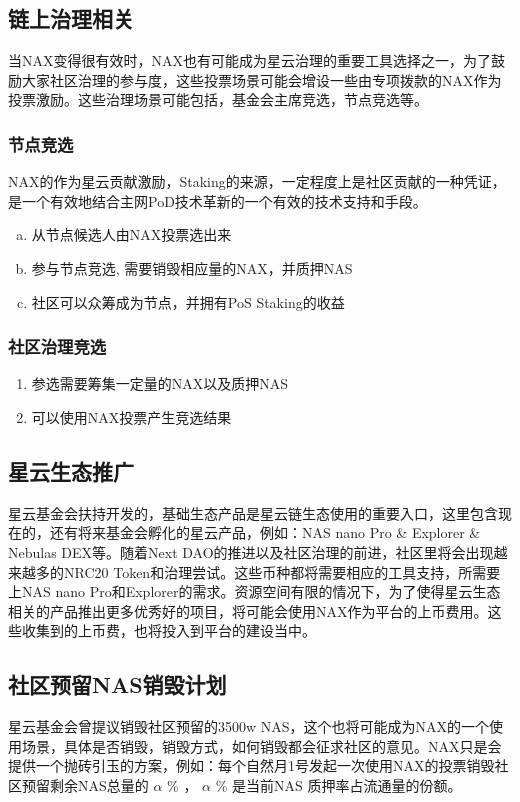 \subsection{链上治理相关}
当NAX变得很有效时，NAX也有可能成为星云治理的重要工具选择之一，为了鼓励大家社区治理的参与度，这些投票场景可能会增设一些由专项拨款的NAX作为投票激励。这些治理场景可能包括，基金会主席竞选，节点竞选等。

\subsubsection{节点竞选}
NAX的作为星云贡献激励，Staking的来源，一定程度上是社区贡献的一种凭证，是一个有效地结合主网PoD技术革新的一个有效的技术支持和手段。

\begin{enumerate}[a.]
  \item 从节点候选人由NAX投票选出来
  \item 参与节点竞选, 需要销毁相应量的NAX，并质押NAS
  \item 社区可以众筹成为节点，并拥有PoS Staking的收益
\end{enumerate}

\subsubsection{社区治理竞选}
\begin{enumerate}
  \item 参选需要筹集一定量的NAX以及质押NAS
  \item 可以使用NAX投票产生竞选结果
\end{enumerate}

\subsection{星云生态推广}
星云基金会扶持开发的，基础生态产品是星云链生态使用的重要入口，这里包含现在的，还有将来基金会孵化的星云产品，例如：NAS nano Pro \& Explorer \& Nebulas DEX等。随着Next DAO的推进以及社区治理的前进，社区里将会出现越来越多的NRC20 Token和治理尝试。这些币种都将需要相应的工具支持，所需要上NAS nano Pro和Explorer的需求。资源空间有限的情况下，为了使得星云生态相关的产品推出更多优秀好的项目，将可能会使用NAX作为平台的上币费用。这些收集到的上币费，也将投入到平台的建设当中。

\subsection{社区预留NAS销毁计划}
星云基金会曾提议销毁社区预留的3500w NAS，这个也将可能成为NAX的一个使用场景，具体是否销毁，销毁方式，如何销毁都会征求社区的意见。NAX只是会提供一个抛砖引玉的方案，例如：每个自然月1号发起一次使用NAX的投票销毁社区预留剩余NAS总量的 \(\alpha\) \% ， \(\alpha\) \% 是当前NAS 质押率占流通量的份额。
